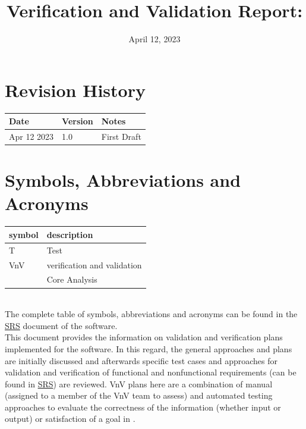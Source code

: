 \documentclass[12pt, titlepage]{article}
\begin{document}
\title{Verification and Validation Report: \progname} 
\author{\authname}
\date{April 12, 2023}
	
\maketitle


\section{Revision History}

\begin{tabularx}{\textwidth}{p{3cm}p{2cm}X}
\toprule {\bf Date} & {\bf Version} & {\bf Notes}\\
\midrule
Apr 12 2023& 1.0 & First Draft\\
\bottomrule
\end{tabularx}

\newpage

\tableofcontents

\listoftables


\newpage

\section{Symbols, Abbreviations and Acronyms}

\renewcommand{\arraystretch}{1.2}
\begin{tabular}{l l} 
  \toprule		
  \textbf{symbol} & \textbf{description}\\
  \midrule 
  T & Test\\
  VnV & verification and validation\\
  \progname{} & Core Analysis\\
  \bottomrule
\end{tabular}\\
The complete table of symbols, abbreviations and acronyms can be found in the \href{https://github.com/KarenKarenWang/cas741_project1/blob/main/docs/SRS/SRS.pdf}{SRS} document of the software. 
\\


This document provides the information on validation and verification plans implemented for the \progname{} software. In this regard, the general approaches and plans are initially discussed and afterwards specific test cases and approaches for validation and verification of functional and nonfunctional requirements (can be found in \href{https://github.com/KarenKarenWang/cas741_project1/blob/main/docs/SRS/SRS.pdf}{SRS}) are reviewed. VnV plans here are a combination of manual (assigned to a member of the VnV team to assess) and automated testing approaches to evaluate the correctness of the information (whether input or output) or satisfaction of a goal in \progname{}. 
\end{document}

